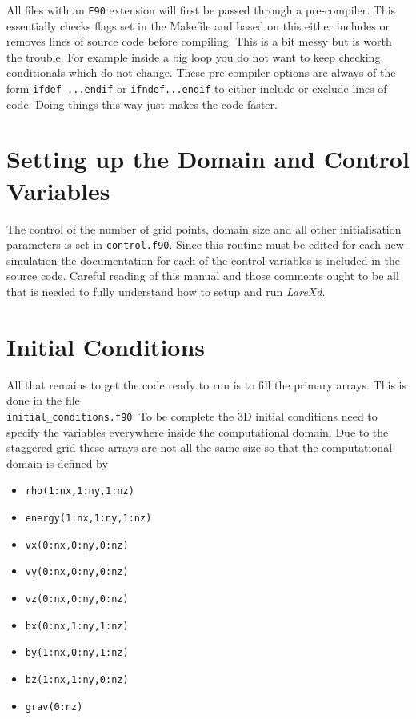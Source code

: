 \documentclass[11pt]{article}
\begin{document}
All files with an \texttt{F90} extension will first be passed through a pre-compiler. This essentially checks flags set in the Makefile and based on this either includes or removes lines of source code before compiling. This is a bit messy but is worth the trouble. For example inside a big loop you do not want to keep checking conditionals which do not change. These pre-compiler options are always of the form \texttt{ifdef ...endif} or \texttt{ifndef...endif} to either include or exclude lines of code. Doing things this way just makes the code faster.

\section{Setting up the Domain and Control Variables}
The control of the number of grid points, domain size and all other initialisation parameters is set in \texttt{control.f90}. Since this routine must be edited for each new simulation the documentation for each of the control variables is included in the source code. Careful reading of this manual and those comments ought to be all that is needed to fully understand how to setup and run \textit{LareXd}.

\section{Initial Conditions}
All that remains to get the code ready to run is to fill the primary arrays. This is done in the file \\ \texttt{initial\_conditions.f90}. To be complete the 3D initial conditions need to specify the variables everywhere inside the computational domain. Due to the staggered grid these arrays are not all the same size so that the computational domain is defined by
\begin{itemize}
\item \texttt{rho(1:nx,1:ny,1:nz)}
\item \texttt{energy(1:nx,1:ny,1:nz)}
\item \texttt{vx(0:nx,0:ny,0:nz)}
\item \texttt{vy(0:nx,0:ny,0:nz)}
\item \texttt{vz(0:nx,0:ny,0:nz)}
\item \texttt{bx(0:nx,1:ny,1:nz)}
\item \texttt{by(1:nx,0:ny,1:nz)}
\item \texttt{bz(1:nx,1:ny,0:nz)}
\item \texttt{grav(0:nz)}
\end{itemize}
\end{document}
